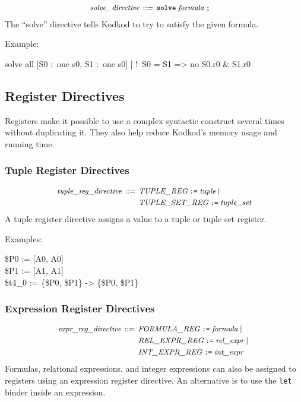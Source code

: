 \documentclass[a4paper,12pt]{article}
\begin{document}
    $$\small\begin{aligned}
                \textit{solve\_directive} \,::=\, {}& \verb|solve|\; \textit{formula}\; \verb|;|
    \end{aligned}$$
%
    The ``solve'' directive tells Kodkod to try to satisfy the given formula.

    Example:

    \pre
    \ttfamily\small
    solve all [S0 :~one s0, S1 :~one s0] | !~S0 = S1 => no S0.r0 \& S1.r0
    \post

    \subsection{Register Directives}
    \label{register-directives}

    Registers make it possible to use a complex syntactic construct several times
    without duplicating it. They also help reduce Kodkod's memory usage and running
    time.

    \subsubsection{Tuple Register Directives}
    \label{tuple-register-directives}

    $$\small\begin{aligned}
                \textit{tuple\_reg\_directive} \,::=\, {}
                & \textit{TUPLE\_REG}\; \verb|:=|\; \textit{tuple} \mid {} \\
                & \textit{TUPLE\_SET\_REG}\; \verb|:=|\; \textit{tuple\_set}
    \end{aligned}$$
%
    A tuple register directive assigns a value to a tuple or tuple set register.

    Examples:

    \pre
    \ttfamily\small
    \$P0 := [A0, A0] \\
    \$P1 := [A1, A1] \\
    \$t4\_0 := \{\$P0, \$P1\} -> \{\$P0, \$P1\}
    \post

    \subsubsection{Expression Register Directives}
    \label{expression-register-directives}

    $$\small\begin{aligned}
                \textit{expr\_reg\_directive} \,::=\, {}
                & \textit{FORMULA\_REG}\; \verb|:=|\; \textit{formula} \mid {} \\
                & \textit{REL\_EXPR\_REG}\; \verb|:=|\; \textit{rel\_expr} \mid {} \\
                & \textit{INT\_EXPR\_REG}\; \verb|:=|\; \textit{int\_expr}
    \end{aligned}$$
%
    Formulas, relational expressions, and integer expressions can also be assigned
    to registers using an expression register directive. An alternative is to use
    the \verb|let| binder inside an expression.
\end{document}
